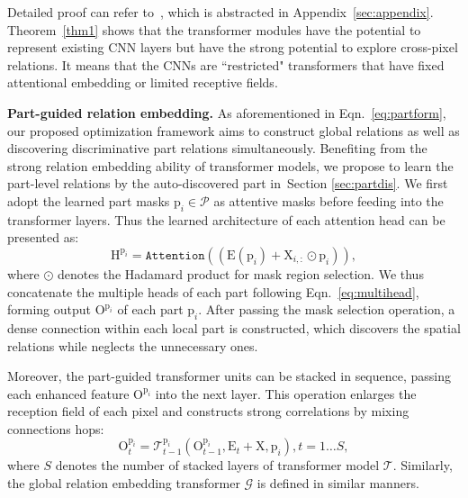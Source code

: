 \documentclass[journal]{IEEEtran}
\newcommand{\secref}[1]{Section \ref{#1}}
\newcommand{\mc}[1]{\mathcal{#1}}
\newcommand{\br}[1]{\bm{\mathrm{#1}}}
\newcommand{\bs}[1]{\boldsymbol{\texttt{#1}}}
\begin{document}
Detailed proof can refer to~\cite{cordonnier2020relationship}, which is abstracted in Appendix~\ref{sec:appendix}. Theorem~\ref{thm1} shows that the transformer modules have the potential to represent existing CNN layers but have the strong potential to explore cross-pixel relations. It means that the CNNs are ``restricted" transformers that have fixed attentional embedding or limited receptive fields.

\textbf{Part-guided relation embedding.} As aforementioned in Eqn.~\eqref{eq:partform}, our proposed optimization framework aims to construct global relations as well as discovering discriminative part relations simultaneously. Benefiting from the strong relation embedding ability of transformer models, we propose to learn the part-level relations by the auto-discovered part in~\secref{sec:partdis}. We first adopt the learned part masks $\br{p}_i \in \mc{P}$ as attentive masks before feeding into the transformer layers.
Thus the learned architecture of each attention head can be presented as:
\begin{equation}\label{eq:parthead}
\br{H}^{\br{p}_i}= \bs{Attention}( (\br{E}(\br{p}_i)+\br{X}_{i,:}\odot \br{p}_i) ),
\end{equation}
where $\odot$ denotes the Hadamard product for mask region selection. We thus concatenate the multiple heads of each part following Eqn.~\eqref{eq:multihead}, forming output $\br{O}^{\br{p}_i}$ of each part $\br{p}_i$. After passing the mask selection operation, a dense connection within each local part is constructed, which discovers the spatial relations while neglects the unnecessary ones.

Moreover, the part-guided transformer units can be stacked in sequence, passing each enhanced feature $\br{O}^{\br{p}_i}$ into the next layer. This operation enlarges the reception field of each pixel and constructs strong correlations by mixing connections hops:
\begin{equation}\label{eq:stacktrans}
\br{O}^{\br{p}_i}_{t}= \mc{T}^{\br{p}_i}_{t-1}(\br{O}^{\br{p}_i}_{t-1},\br{E}_{t}+\br{X},\br{p}_i), t=1\ldots S,
\end{equation}
where $S$ denotes the number of stacked layers of transformer model $\mc{T}$. Similarly, the global relation embedding transformer $\mc{G}$ is defined in similar manners.
\end{document}
